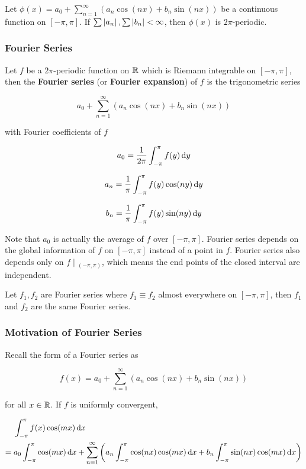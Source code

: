 \documentclass[a4paper,12pt]{article}
\begin{document}
\begin{pst}
  Let $\phi(x)=a_{0}+\sum_{n=1}^{\infty}(a_{n}\cos(nx)+b_{n}\sin(nx))$ be a continuous function on $[-\pi,\pi]$. If $\sum\left| a_{n}\right|,\sum\left| b_{n}\right|<\infty$, then $\phi(x)$ is $2\pi$-periodic.
\end{pst}

\propdisp

\subsubsection{Fourier Series}
\begin{dft}
  Let $f$ be a $2\pi$-periodic function on $\mathbb{R}$ which is Riemann integrable on $[-\pi,\pi]$, then the \textbf{Fourier series} (or \textbf{Fourier expansion}) of $f$ is the trigonometric series

  $$a_{0}+\sum_{n=1}^{\infty}(a_{n}\cos(nx)+b_{n}\sin(nx))$$\s

  with Fourier coefficients of $f$

  $$a_{0}=\frac{1}{2\pi}\int_{-\pi}^{\pi}f(y)\,\mathrm{d} y$$\s

  $$a_{n}=\frac{1}{\pi}\int_{-\pi}^{\pi}f(y)\cos(ny)\,\mathrm{d} y$$\s

  $$b_{n}=\frac{1}{\pi}\int_{-\pi}^{\pi}f(y)\sin(ny)\,\mathrm{d} y$$\s
\end{dft}\n

Note that $a_{0}$ is actually the average of $f$ over $[-\pi,\pi]$. Fourier series depends on the global information of $f$ on $[-\pi,\pi]$ instead of a point in $f$. Fourier series also depends only on $f\!\mid\!_{(-\pi,\pi)}$, which means the end points of the closed interval are independent.\n

\begin{pst}
  Let $f_{1},f_{2}$ are Fourier series where $f_{1}\equiv f_{2}$ almost everywhere on $[-\pi,\pi]$, then $f_{1}$ and $f_{2}$ are the same Fourier series.
\end{pst}

\subsubsection{Motivation of Fourier Series}
Recall the form of a Fourier series as

$$f(x)=a_{0}+\sum_{n=1}^{\infty}(a_{n}\cos(nx)+b_{n}\sin(nx))$$\s

for all $x\in\mathbb{R}$. If $f$ is uniformly convergent,

$$\begin{aligned}[t]
  &\int_{-\pi}^{\pi}f(x)\cos(mx)\,\mathrm{d} x\\
  =\;&a_{0}\int_{-\pi}^{\pi}\cos(mx)\,\mathrm{d} x+\sum_{n=1}^{\infty}\left( a_{n}\int_{-\pi}^{\pi}\cos(nx)\cos(mx)\,\mathrm{d} x+b_{n}\int_{-\pi}^{\pi}\sin(nx)\cos(mx)\,\mathrm{d} x\right)
\end{aligned}$$\s
\end{document}
